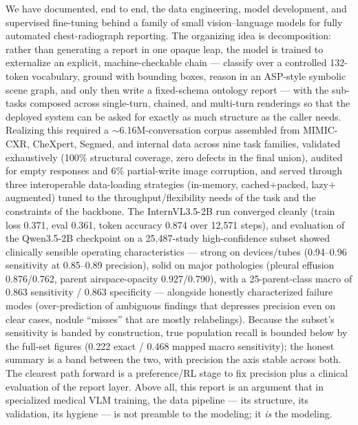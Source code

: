 \documentclass[11pt,a4paper]{article}
\begin{document}
We have documented, end to end, the data engineering, model development, and supervised fine-tuning behind a family of small vision--language models for fully automated chest-radiograph reporting. The organizing idea is decomposition: rather than generating a report in one opaque leap, the model is trained to externalize an explicit, machine-checkable chain --- classify over a controlled 132-token vocabulary, ground with bounding boxes, reason in an ASP-style symbolic scene graph, and only then write a fixed-schema ontology report --- with the sub-tasks composed across single-turn, chained, and multi-turn renderings so that the deployed system can be asked for exactly as much structure as the caller needs. Realizing this required a $\sim$6.16M-conversation corpus assembled from MIMIC-CXR, CheXpert, Segmed, and internal data across nine task families, validated exhaustively (100\% structural coverage, zero defects in the final union), audited for empty responses and 6\% partial-write image corruption, and served through three interoperable data-loading strategies (in-memory, cached$+$packed, lazy$+$augmented) tuned to the throughput/flexibility needs of the task and the constraints of the backbone. The InternVL3.5-2B run converged cleanly (train loss 0.371, eval 0.361, token accuracy 0.874 over 12{,}571 steps), and evaluation of the Qwen3.5-2B checkpoint on a 25{,}487-study high-confidence subset showed clinically sensible operating characteristics --- strong on devices/tubes (0.94--0.96 sensitivity at 0.85--0.89 precision), solid on major pathologies (pleural effusion 0.876/0.762, parent airspace-opacity 0.927/0.790), with a 25-parent-class macro of 0.863 sensitivity / 0.863 specificity --- alongside honestly characterized failure modes (over-prediction of ambiguous findings that depresses precision even on clear cases, nodule ``misses'' that are mostly relabelings). Because the subset's sensitivity is banded by construction, true population recall is bounded below by the full-set figures (0.222 exact / 0.468 mapped macro sensitivity); the honest summary is a band between the two, with precision the axis stable across both. The clearest path forward is a preference/RL stage to fix precision plus a clinical evaluation of the report layer. Above all, this report is an argument that in specialized medical VLM training, the data pipeline --- its structure, its validation, its hygiene --- is not preamble to the modeling; it \emph{is} the modeling.

\appendix
\newpage
\end{document}
